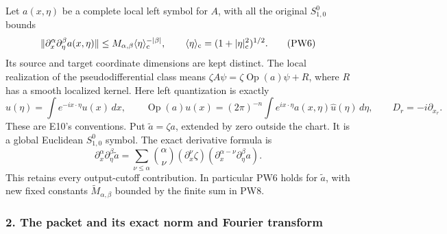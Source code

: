\documentclass[
  11pt,
]{article}
\makeatletter
\let\ReaderOriginalAnchorStart\hyper@anchorstart
\let\ReaderOriginalAnchorEnd\hyper@anchorend
\let\ReaderPendingAliases\@empty
\def\ReaderArmAliases#1{\gdef\ReaderPendingAliases{#1}}
\def\hyper@anchorstart#1{\ReaderIfNativeAnchorTF{#1}{\ReaderPendingAliases\global\let\ReaderPendingAliases\@empty}{}\ReaderOriginalAnchorStart{#1}}
\makeatother
\begin{document}
Let \(a(x,\eta)\) be a complete local left symbol for \(A\), with all
the original \(S^0_{1,0}\) bounds \[
 \|\partial_x^\alpha\partial_\eta^\beta a(x,\eta)\|
      \leq M_{\alpha,\beta}\langle\eta\rangle_{\rm c}^{-|\beta|},
 \qquad
 \langle\eta\rangle_{\rm c}=(1+|\eta|_{\rm c}^2)^{1/2}.
 \tag{PW6}
\] Its source and target coordinate dimensions are kept distinct. The
local realization of the pseudodifferential class means
\(\zeta A\psi=\zeta\operatorname{Op}(a)\psi+R\), where \(R\) has a
smooth localized kernel. Here left quantization is exactly \[
 \widehat u(\eta)=\int e^{-ix\cdot\eta}u(x)\,dx,\qquad
 \operatorname{Op}(a)u(x)=(2\pi)^{-n}
       \int e^{ix\cdot\eta}a(x,\eta)\widehat u(\eta)\,d\eta ,
 \qquad D_r=-i\partial_{x_r}.
 \tag{PW7}
\] These are E10's conventions. Put \(\widetilde a=\zeta a\), extended
by zero outside the chart. It is a global Euclidean \(S^0_{1,0}\)
symbol. The exact derivative formula is \[
 \partial_x^\alpha\partial_\eta^\beta\widetilde a
  =\sum_{\nu\leq\alpha}{\alpha\choose\nu}
       (\partial_x^\nu\zeta)
       (\partial_x^{\alpha-\nu}\partial_\eta^\beta a).
 \tag{PW8}
\] This retains every output-cutoff contribution. In particular PW6
holds for \(\widetilde a\), with new fixed constants
\(\widetilde M_{\alpha,\beta}\) bounded by the finite sum in PW8.

\ReaderArmAliases{\ReaderOriginalAnchorStart{2-the-packet-and-its-exact-norm-and-fourier-transform}\ReaderOriginalAnchorEnd\begingroup\expandafter\def\csname @currentHref\endcsname{2-the-packet-and-its-exact-norm-and-fourier-transform}\label{2-the-packet-and-its-exact-norm-and-fourier-transform}\endgroup}
\subsubsection{2. The packet and its exact norm and Fourier
transform}\label{the-packet-and-its-exact-norm-and-fourier-transform}
\end{document}
